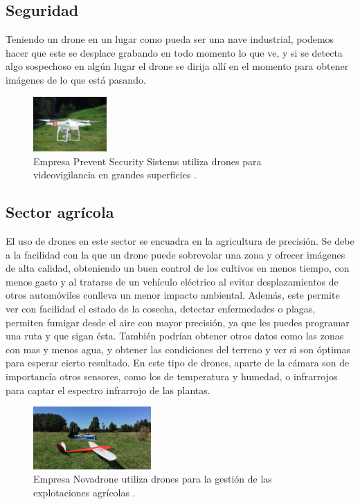\subsection{Seguridad} 
\hspace{1 cm}Teniendo un drone en un lugar como pueda ser una nave industrial, podemos hacer que este se desplace grabando en todo momento lo que ve, y si se detecta algo sospechoso en alg\'un lugar el drone se dirija all\'i en el momento para obtener im\'agenes de lo que est\'a pasando. 

\begin{figure}[H]
	\centering
		\includegraphics[width=0.25\textwidth]{imgs/seguridad_drone.jpg}
		\caption{Empresa Prevent Security Sistems utiliza drones para videovigilancia en grandes superficies .}
	\label{fig: Empresa Prevent Security Sistems realiza videovigilancia con drones.}
\end{figure}

	\subsection{Sector agr\'icola} 
\hspace{1 cm}El uso de drones en este sector se encuadra en la agricultura de precisi\'on. Se debe a la facilidad con la que un drone puede sobrevolar una zona y ofrecer im\'agenes de alta calidad, obteniendo un buen control de los cultivos en menos tiempo, con menos gasto y al tratarse de un veh\'iculo el\'ectrico al evitar desplazamientos de otros autom\'oviles conlleva un menor impacto ambiental. Adem\'as, este permite ver con facilidad el estado de la cosecha, detectar enfermedades o plagas, permiten fumigar desde el aire con mayor precisi\'on, ya que les puedes programar una ruta y que sigan \'esta. Tambi\'en podr\'ian obtener otros datos como las zonas con mas y menos agua, y obtener las condiciones del terreno y ver si son \'optimas para esperar cierto resultado. En este tipo de drones, aparte de la c\'amara son de importanc\'ia otros sensores, como los de temperatura y humedad, o infrarrojos para captar el espectro infrarrojo de las plantas. 
	
	
\begin{figure}[H]
	\centering
		\includegraphics[width=0.4\textwidth]{imgs/novadrone.jpg}
		\caption{Empresa Novadrone utiliza drones para la gesti\'on de las explotaciones agr\'icolas .}
	\label{fig: Empresa Novadrone, aplicaciones en agricultura.}
\end{figure}

